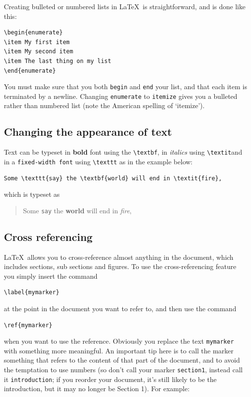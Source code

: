 \begin{refsection}
Creating bulleted or numbered lists in \LaTeX\ is straightforward, and is done like this:

\begin{verbatim}
\begin{enumerate}
\item My first item
\item My second item
\item The last thing on my list
\end{enumerate}
\end{verbatim}
%
You must make sure that you both \texttt{begin} and \texttt{end} your list, and that each item is terminated by a newline. Changing \texttt{enumerate} to \texttt{itemize} gives you a bulleted rather than numbered list (note the American spelling of `itemize').  

\subsection{Changing the appearance of text}
Text can be typeset in \textbf{bold} font using the \verb|\textbf|, in \textit{italics} using \verb|\textit|and in a \texttt{fixed-width font}  using \verb+\texttt+ as in the example below:

\begin{verbatim}
Some \texttt{say} the \textbf{world} will end in \textit{fire},
\end{verbatim}

which is typeset as

\begin{quote}
Some \texttt{say} the \textbf{world} will end in \textit{fire},  
\end{quote}
\subsection{Cross referencing}

\LaTeX\ allows you to cross-reference almost anything in the document, which includes sections, sub sections and figures. To use the cross-referencing feature you simply insert the command 
\begin{verbatim}
\label{mymarker}
\end{verbatim}
at the point in the document you want to refer to, and then use the command

\begin{verbatim}
\ref{mymarker}
\end{verbatim}
when you want to use the reference. Obviously you replace the text \texttt{mymarker} with something more meaningful. An important tip here is to call the marker something that refers to the content of that part of the document, and to avoid the temptation to use numbers (so don't call your marker \texttt{section1}, instead call it \texttt{introduction}; if you reorder your document, it's still likely to be the introduction, but it may no longer be Section 1). For example:


\end{refsection}
